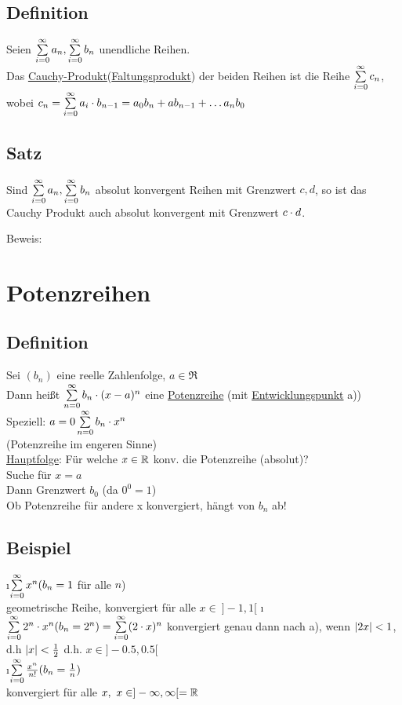 \subsection{Definition}
Seien $ \sum\limits_{i=0}^{\infty} a_n, \sum\limits_{i=0}^{\infty} b_n$ unendliche Reihen.\\
Das \underline{Cauchy-Produkt}(\underline{Faltungsprodukt}) der beiden Reihen ist die Reihe $\sum\limits_{i=0}^{\infty} c_n$, wobei $c_n = \sum\limits_{i=0}^{\infty} a_i \cdot b_{n-1} = a_0b_n + ab_{n-1} + \ldots a_nb_0$
\subsection[Satz: Konvergenz im Cauchy Produkt]{Satz}
Sind $\sum\limits_{i=0}^{\infty} a_n, \sum\limits_{i=0}^{\infty} b_n$ absolut konvergent Reihen mit Grenzwert $c ,d$, so ist das Cauchy Produkt auch absolut konvergent mit Grenzwert $c \cdot d$. \begin{flushright}
Beweis: \cite{k1}
\end{flushright}

\section{Potenzreihen}
\subsection{Definition}
Sei $(b_n)$ eine reelle Zahlenfolge, $a \in \Re$\\
Dann hei\ss t $\sum\limits_{n=0}^{\infty} b_n \cdot (x-a)^n$ eine \underline{Potenzreihe} (mit \underline{Entwicklungspunkt} a))
Speziell: $a=0\\
\sum\limits_{n = 0}^{\infty} b_n \cdot x^n$\\
(Potenzreihe im engeren Sinne)\\
\underline{Hauptfolge}: Für welche $x \in \mathbb{R}$ konv. die Potenzreihe (absolut)?\\
Suche für $x=a$\\
Dann Grenzwert $b_ 0$ (da $0^0 = 1$)\\
Ob Potenzreihe für andere x konvergiert, hängt von $b_n$ ab!
\subsection{Beispiel} 
\begin{enumerate}[a)]
\i $\sum\limits_{i=0}^{\infty} x^n (b_n =1$ für alle $n$)\\
geometrische Reihe, konvergiert für alle $x \in \  ]-1,1[$
\i $\sum\limits_{i=0}^{\infty} 2^n \cdot x^n (b_n = 2^n) = \sum\limits_{i=0}^{\infty} (2 \cdot x)^n$
konvergiert genau dann nach a), wenn $\lvert 2x \rvert < 1$, d.h $\lvert x \rvert < \frac{1}{2}$ d.h. $x \in ]-0.5, 0.5[$\\
\i $\sum\limits_{i=0}^{\infty} \frac{x^n}{n!} (b_n = \frac{1}{n})$\\
konvergiert für alle $x, \ x \in ]-\infty,\infty[ = \mathbb{R} $\\
\end{enumerate}
